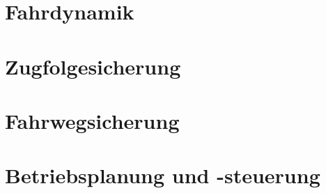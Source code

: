 \documentclass[
  paper=a4,
  pagesize=pdftex,
  twoside=false,
  DIV=12,
  headinclude=true,
  footinclude=false,
  toc=listof,
]{scrbook}
\def\ROOT{.}
\begin{document}

  
  \tableofcontents
  
  \cleardoublepage

  \chapter{Fahrdynamik}
    
    
    \cleardoublepage
    
    \cleardoublepage
    

  \chapter{Zugfolgesicherung}
    
    \cleardoublepage
    
    \cleardoublepage
    

  \chapter{Fahrwegsicherung}
    
    \cleardoublepage
    
    \cleardoublepage
    
    \cleardoublepage
    

  \chapter{Betriebsplanung und -steuerung}
   


  \cleardoublepage
  \appendix
  
  \vhListAllAuthorsLongWithAbbrev
\end{document}
